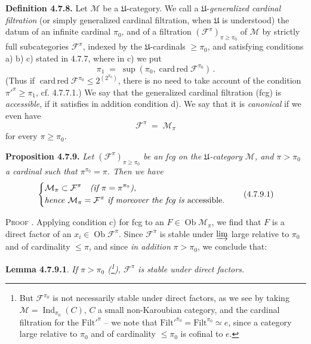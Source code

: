 \documentclass[11pt]{article}
\newcommand{\printedpage}[1]{\marginpar{\footnotesize p.~#1}}
\newcommand{\msp}[1]{\marginpar{\footnotesize [#1]}}
\newcommand{\Ob}{\operatorname{Ob}}
\newcommand{\Filt}{\mathrm{Filt}}
\newcommand{\Ind}{\operatorname{Ind}}
\newcommand{\cardred}{\operatorname{card\,red}}
\begin{document}
\textbf{Definition 4.7.8.} Let $\mathcal{M}$ be a $\mathfrak{U}$-category. We call a $\mathfrak{U}$-\textit{generalized cardinal filtration} (or simply generalized cardinal filtration, when $\mathfrak{U}$ is understood) the datum of an infinite cardinal $\pi_0$, and of a filtration $(\mathcal{F}^{\pi})_{\pi\geqslant\pi_0}$ of $\mathcal{M}$ by strictly full subcategories $\mathcal{F}^{\pi}$, indexed by the $\mathfrak{U}$-cardinals $\geqslant\pi_0$, and satisfying conditions a) b) c) stated in 4.7.7, where in c) we put
\[
\pi_1 \;=\; \sup(\pi_0,\cardred\mathcal{F}^{\pi_0}) \, . \tag*{(4.7.8.1)}
\]
(Thus if $\cardred\mathcal{F}^{\pi_0}\leqslant 2^{(2^{\pi_0})}$, there is no need to take account of the condition $\pi'^{\pi}\geqslant\pi_1$, cf. 4.7.7.1.) We say that the generalized cardinal filtration (fcg) is \textit{accessible}, if it satisfies in addition condition d). We say that it is \textit{canonical} if we even have
\[
\mathcal{F}^{\pi} \;=\; \mathcal{M}_{\pi} \tag*{(4.7.8.2)}
\]
for every $\pi\geqslant\pi_0$.

\textbf{Proposition 4.7.9.} \textit{Let $(\mathcal{F}^{\pi})_{\pi\geqslant\pi_0}$ be an fcg on the $\mathfrak{U}$-category $\mathcal{M}$, and $\pi>\pi_0$ a cardinal such that $\pi^{\pi_0}=\pi$. Then we have}
\printedpage{60}
\msp{page 177}
\[
\left\{
\begin{aligned}
&\mathcal{M}_\pi\subset\mathcal{F}^{\pi}\quad\text{\textit{(if $\pi=\pi^{\pi_0}$),}}\\
&\text{\textit{hence} }\mathcal{M}_\pi=\mathcal{F}^{\pi}\text{ \textit{if moreover the fcg is} accessible.}
\end{aligned}
\right.
\tag*{(4.7.9.1)}
\]

\textsc{Proof} . Applying condition c) for fcg to an $F\in\Ob\mathcal{M}_\pi$, we find that $F$ is a direct factor of an $x_i\in\Ob\mathcal{F}^{\pi}$. Since $\mathcal{F}^{\pi}$ is stable under $\varinjlim$ large relative to $\pi_0$ and of cardinality $\leqslant\pi$, and since \textit{in addition} $\pi>\pi_0$, we conclude that:

\textbf{Lemma 4.7.9.1}. \textit{If $\pi>\pi_0$ (\footnote[76]{But $\mathcal{F}^{\pi_0}$ is not necessarily stable under direct factors, as we see by taking $\mathcal{M}=\Ind_{\pi_0}(C)$, $C$ a small non-Karoubian category, and the cardinal filtration for the $\Filt'^{\pi}$ -- we note that $\Filt'^{\pi_0}=\Filt^{\pi_0}\simeq e$, since a category large relative to $\pi_0$ and of cardinality $\leqslant\pi_0$ is cofinal to $e$.}), $\mathcal{F}^{\pi}$ is stable under direct factors.}
\end{document}
